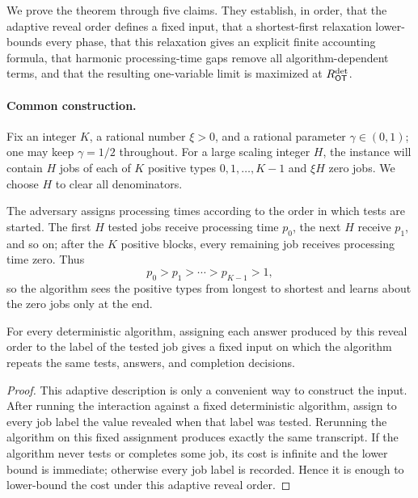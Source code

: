We prove the theorem through five claims.  They establish, in order, that the
adaptive reveal order defines a fixed input, that a shortest-first relaxation
lower-bounds every phase, that this relaxation gives an explicit finite
accounting formula, that harmonic processing-time gaps remove all
algorithm-dependent terms, and that the resulting one-variable limit is
maximized at $R_{\mathsf{OT}}^{\mathrm{det}}$.

\paragraph{Common construction.}
Fix an integer $K$, a rational number $\xi>0$, and a rational parameter
$\gamma\in(0,1)$; one may keep $\gamma=1/2$ throughout.  For a large scaling
integer $H$, the instance will contain $H$ jobs of each of $K$ positive types
$0,1,\ldots,K-1$ and $\xi H$ zero jobs.  We choose $H$ to clear all
denominators.

The adversary assigns processing times according to the order in which tests
are started.  The first $H$ tested jobs receive processing time $p_0$, the
next $H$ receive $p_1$, and so on; after the $K$ positive blocks, every
remaining job receives processing time zero.  Thus
\[
  p_0>p_1>\cdots>p_{K-1}>1,
\]
so the algorithm sees the positive types from longest to shortest and learns
about the zero jobs only at the end.

\begin{claim}
\label{clm:lower-fixed-input}
For every deterministic algorithm, assigning each answer produced by this
reveal order to the label of the tested job gives a fixed input on which the
algorithm repeats the same tests, answers, and completion decisions.
\end{claim}

\begin{proof}
This adaptive description is only a convenient way to construct the input.
After running the interaction against a fixed deterministic algorithm, assign
to every job label the value revealed when that label was tested.  Rerunning
the algorithm on this fixed assignment produces exactly the same transcript.
If the algorithm never tests or completes some job, its cost is infinite and
the lower bound is immediate; otherwise every job label is recorded.
Hence it is enough to lower-bound the cost under this adaptive reveal order.
\end{proof}

